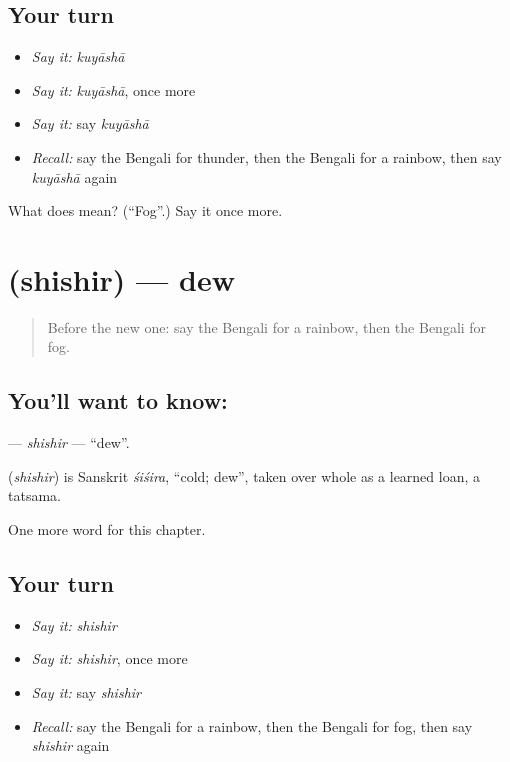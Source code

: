 \subsection*{Your turn}
\begin{itemize}
\raggedright
  \item \emph{Say it:} \emph{kuyāshā}
  \item \emph{Say it:} \emph{kuyāshā}, once more
  \item \emph{Say it:} say \emph{kuyāshā}
  \item \emph{Recall:} say the Bengali for thunder, then the Bengali for a rainbow, then say \emph{kuyāshā} again
\end{itemize}

\begin{tcolorbox}[breakable,colback=teal!4,colframe=teal!35!black,title={Before you move on}]
What does  mean? (\textquotedblleft{}Fog\textquotedblright{}.) Say it once more.
\end{tcolorbox}
\section[\texorpdfstring{\bn{শিশির} (shishir)}{শিশির (shishir)}]{ (shishir) — dew}

\label{lesson:BN-C114-shishir}



\begin{quote}
Before the new one: say the Bengali for a rainbow, then the Bengali for fog.
\end{quote}

\subsection*{You'll want to know: }
\textbf{} — \emph{shishir} — \textquotedblleft{}dew\textquotedblright{}.

\begin{cousinweb}
\textbf{} (\emph{shishir}) is Sanskrit \emph{śiśira}, \textquotedblleft{}cold; dew\textquotedblright{}, taken over whole as a learned loan, a tatsama.
\end{cousinweb}

\begin{grammarlens}[title={What you've built}]
One more word for this chapter.
\end{grammarlens}

\subsection*{Your turn}
\begin{itemize}
\raggedright
  \item \emph{Say it:} \emph{shishir}
  \item \emph{Say it:} \emph{shishir}, once more
  \item \emph{Say it:} say \emph{shishir}
  \item \emph{Recall:} say the Bengali for a rainbow, then the Bengali for fog, then say \emph{shishir} again
\end{itemize}


